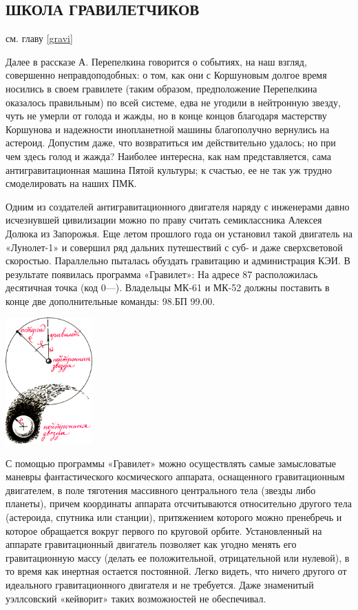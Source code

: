 \documentclass[11pt,a4paper,oneside]{article}
\begin{document}
\subsection{ШКОЛА ГРАВИЛЕТЧИКОВ}
см. главу \ref{gravi}

Далее в рассказе А. Перепелкина говорится о событиях, на наш взгляд, совершенно неправдоподобных: о том, как они с Коршуновым долгое время носились в своем гравилете (таким образом, предположение Перепелкина оказалось правильным) по всей системе, едва не угодили в нейтронную звезду, чуть не умерли от голода и жажды, но в конце концов благодаря мастерству Коршунова и надежности инопланетной машины благополучно вернулись на астероид. Допустим даже, что возвратиться им действительно удалось; но при чем здесь голод и жажда? Наиболее интересна, как нам представляется, сама антигравитационная машина Пятой культуры; к счастью, ее не так уж трудно смоделировать на наших ПМК.

Одним из создателей антигравитационного двигателя наряду с инженерами давно исчезнувшей цивилизации можно по праву считать семиклассника Алексея Долюка из Запорожья. Еще летом прошлого года он установил такой двигатель на «Лунолет-1» и совершил ряд дальних путешествий с суб- и даже сверхсветовой скоростью. Параллельно пыталась обуздать гравитацию и администрация КЭИ. В результате появилась программа «Гравилет»:
На адресе 87 расположилась десятичная точка (код 0—). Владельцы МК-61 и МК-52 должны поставить в конце две дополнительные команды: 98.БП 99.00.

\includegraphics[width=0.25\textwidth]{pulsar_nav}

С помощью программы «Гравилет» можно осуществлять самые замысловатые маневры фантастического космического аппарата, оснащенного гравитационным двигателем, в поле тяготения массивного центрального тела (звезды либо планеты), причем координаты аппарата отсчитываются относительно другого тела (астероида, спутника или станции), притяжением которого можно пренебречь и которое обращается вокруг первого по круговой орбите. Установленный на аппарате гравитационный двигатель позволяет как угодно менять его гравитационную массу (делать ее положительной, отрицательной или нулевой), в то время как инертная остается постоянной. Легко видеть, что ничего другого от идеального гравитационного двигателя и не требуется. Даже знаменитый уэллсовский «кейворит» таких возможностей не обеспечивал.
\end{document}
